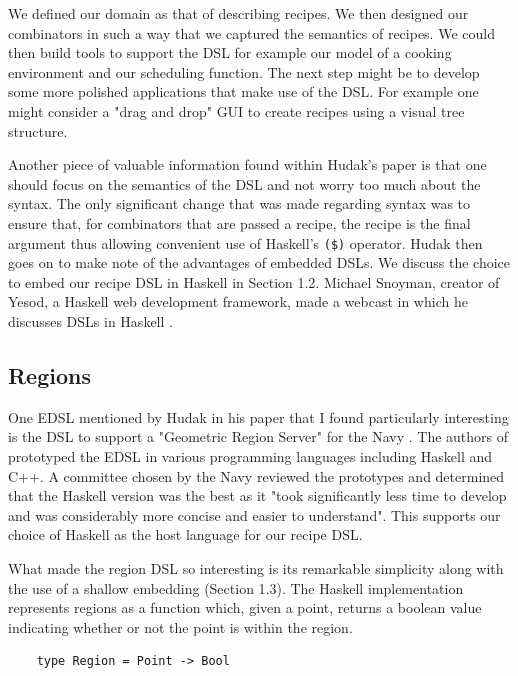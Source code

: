 \documentclass[11pt]{article}
\begin{document}
We defined our domain as that of describing recipes. We then designed our
combinators in such a way that we captured the semantics of recipes. We could then
build tools to support the DSL for example our model of a cooking environment
and our scheduling function. The next step might be to develop some more
polished applications that make use of the DSL. For example one might consider
a "drag and drop" GUI to create recipes using a visual tree structure.

\medbreak

Another piece of valuable information found within Hudak's paper is that
one should focus on the semantics of the DSL and not worry too much about
the syntax. The only significant change that was made regarding syntax was
to ensure that, for combinators that are passed a recipe, the recipe is the
final argument thus allowing convenient use of Haskell's \texttt{(\$)} operator.
Hudak then goes on to make note of the advantages of embedded DSLs. We discuss
the choice to embed our recipe DSL in Haskell in Section 1.2. Michael Snoyman,
creator of Yesod, a Haskell web development framework, made a webcast in which
he discusses DSLs in Haskell \cite{snoyman}.

\subsection{Regions}

One EDSL mentioned by Hudak in his paper \cite{hudak} that I found particularly
interesting is the DSL to support a "Geometric Region Server" for the Navy \cite{regions}.
The authors of \cite{regions} prototyped the EDSL in various programming languages
including Haskell and C++. A committee chosen by the Navy reviewed the prototypes and
determined that the Haskell version was the best as it "took significantly less time to
develop and was considerably more concise and easier to understand". This supports
our choice of Haskell as the host language for our recipe DSL.

\medbreak

What made the region DSL so interesting is its remarkable simplicity along with the use of
a shallow embedding (Section 1.3). The Haskell implementation represents regions as
a function which, given a point, returns a boolean value indicating whether or not
the point is within the region.

\begin{lstlisting}
    type Region = Point -> Bool
\end{lstlisting}
\end{document}
